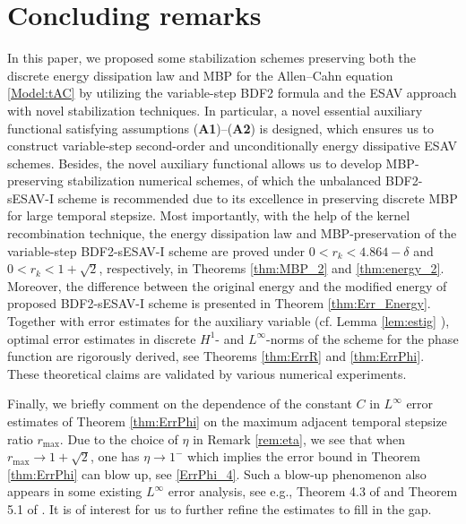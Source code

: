 \documentclass{m2an}
\begin{document}
\section{Concluding remarks}
In this paper, we proposed some stabilization schemes preserving both the discrete energy dissipation law and MBP for the Allen--Cahn equation \eqref{Model:tAC} by utilizing the variable-step BDF2 formula and the ESAV approach with novel stabilization techniques. In particular, a novel essential auxiliary functional satisfying assumptions (\textbf{A1})--(\textbf{A2}) is designed, which ensures us to construct variable-step second-order and unconditionally energy dissipative ESAV schemes.
Besides, the novel auxiliary functional allows us to develop MBP-preserving stabilization numerical schemes, of which the unbalanced BDF2-sESAV-I scheme is recommended due to its excellence in preserving discrete MBP for large temporal stepsize. Most importantly, with the help of the kernel recombination technique, the energy dissipation law and MBP-preservation of the variable-step BDF2-sESAV-I scheme are proved under $ 0 < r_{k} < 4.864 - \delta $ and $ 0 < r_{k} < 1 + \sqrt{2} $, respectively, in Theorems \ref{thm:MBP_2} and \ref{thm:energy_2}. Moreover, the difference between the original energy and the modified energy of proposed BDF2-sESAV-I scheme is presented in Theorem \ref{thm:Err_Energy}. Together with error estimates for the auxiliary variable (cf. Lemma \ref{lem:estig} ), optimal error estimates in discrete $ H^{1}$- and $ L^{\infty} $-norms of the scheme for the phase function are rigorously derived, see Theorems \ref{thm:ErrR} and \ref{thm:ErrPhi}. These theoretical claims are validated by various numerical experiments.

Finally, we briefly comment on the dependence of the constant $C$ in $ L^{\infty} $ error estimates of Theorem \ref{thm:ErrPhi} on the maximum adjacent temporal stepsize ratio $ r_{\max} $. Due to the choice of $\eta$ in Remark \ref{rem:eta}, we see that when $ r_{\max} \rightarrow 1 + \sqrt{2} $, one has $ \eta \rightarrow 1^{-} $ which implies the error bound in Theorem \ref{thm:ErrPhi} can blow up, see \eqref{ErrPhi_4}. Such a blow-up phenomenon also appears in some existing $ L^{\infty} $ error analysis, see e.g., Theorem 4.3 of \cite{MOC_2023_Ju} and Theorem 5.1 of \cite{SINUM_2020_Liao}. It is of interest for us to further refine the estimates to fill in the gap.
\end{document}
